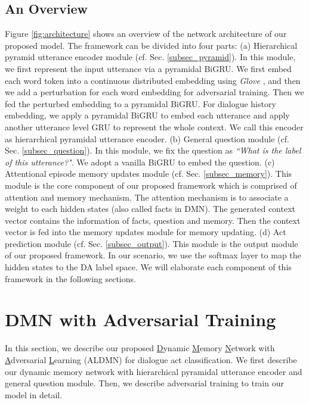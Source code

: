 \documentclass[conference]{IEEEtran}
\begin{document}
	\subsection{An Overview}
	Figure \ref{fig:architecture} shows an overview of the network architecture of our proposed model. The framework can be divided into four parts: (a) Hierarchical pyramid utterance encoder module (cf. Sec. \ref{subsec_pyramid}). In this module, we first represent the input utterance via a pyramidal BiGRU. We first embed each word token into a continuous distributed embedding using \textit{Glove} \cite{pennington2014glove}, and then we add a perturbation for each word embedding for adversarial training. Then we fed the perturbed embedding to a pyramidal BiGRU. For dialogue history embedding, we apply a pyramidal BiGRU to embed each utterance and apply another utterance level GRU to represent the whole context. We call this encoder as hierarchical pyramidal utterance encoder.
	(b) General question module (cf. Sec. \ref{subsec_question}). In this module, we fix the question as \textit{``What is the label of this utterance?"}. We adopt a vanilla BiGRU to embed the question.
	(c) Attentional episode memory updates module (cf. Sec. \ref{subsec_memory}). This module is the core component of our proposed framework which is comprised of attention and memory mechanism. The attention mechanism is to associate a weight to each hidden states (also called facts in DMN). The generated context vector contains the information of facts, question and memory. Then the context vector is fed into the memory updates module for memory updating.
	(d) Act prediction module (cf. Sec. \ref{subsec_output}). This module is the output module of our proposed framework. In our scenario, we use the softmax layer to map the hidden states to the DA label space. We will elaborate each component of this framework in the following sections.
	
	
	\section{DMN with Adversarial Training} \label{sec_model}%
	In this section, we describe our proposed \underline{D}ynamic \underline{M}emory \underline{N}etwork with \underline{A}dversarial \underline{L}earning (ALDMN) for dialogue act classification. We first describe our dynamic memory network with hierarchical pyramidal utterance encoder and general question module. Then, we describe adversarial training to train our model in detail.
\end{document}
